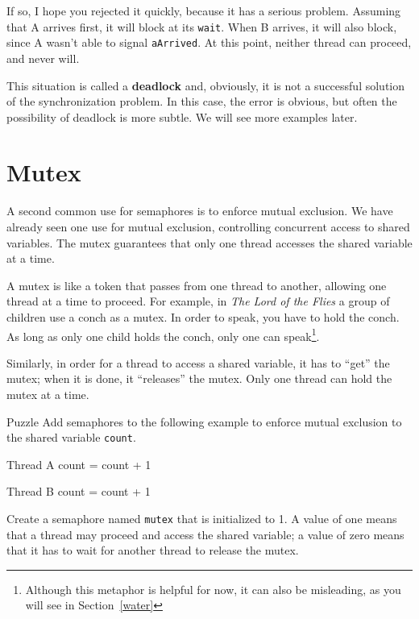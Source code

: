 If so, I hope you rejected it quickly, because it has a serious
problem.  Assuming that A arrives first, it will block at its
{\tt wait}.  When B arrives, it will also block, since A wasn't
able to signal {\tt aArrived}.  At this point, neither thread
can proceed, and never will.

This situation is called a {\bf deadlock} and, obviously, it is
not a successful solution of the synchronization problem.  In
this case, the error is obvious, but often the possibility of
deadlock is more subtle.  We will see more examples later.


\section{Mutex}

A second common use for semaphores is to enforce mutual exclusion.
We have already seen one use for mutual exclusion, controlling
concurrent access to shared variables.  The mutex guarantees
that only one thread accesses the shared variable at a time.

A mutex is like a token that passes from one thread to another,
allowing one thread at a time to proceed.  For example, in {\em The
Lord of the Flies} a group of children use a conch as a mutex.  In
order to speak, you have to hold the conch.  As long as only one child
holds the conch, only one can speak\footnote{Although this metaphor
is helpful for now, it can also be misleading, as you will see in
Section~\ref{water}}.

Similarly, in order for a thread to access a shared variable,
it has to ``get'' the mutex; when it is done, it ``releases''
the mutex.  Only one thread can hold the mutex at a time.

\begin{puzzlebox}{Puzzle}
Add semaphores to the following example to
enforce mutual exclusion to the shared variable {\tt count}.

\begin{lsthalfbox}[before skip=0.6em]{Thread A}
count = count + 1
\end{lsthalfbox}
\begin{lsthalfbox}[after skip=0.6em]{Thread B}
count = count + 1
\end{lsthalfbox}



Create a semaphore named {\tt mutex} that is initialized
to 1.  A value of one means that a thread may proceed and
access the shared variable; a value of zero means that it
has to wait for another thread to release the mutex.
\end{puzzlebox}


